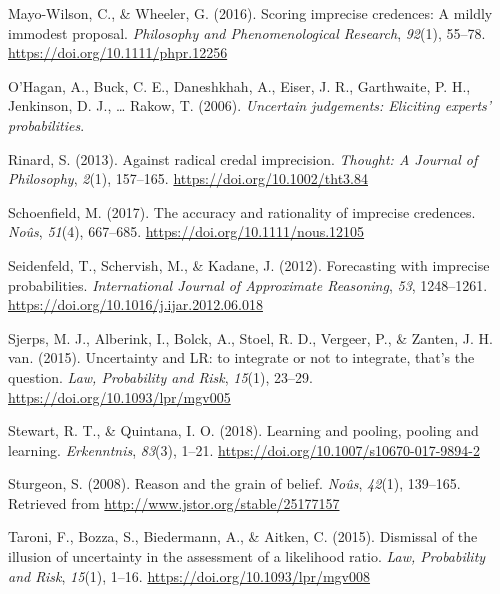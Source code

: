 \documentclass[
  10pt,
  dvipsnames,enabledeprecatedfontcommands]{scrartcl}
\newlength{\cslhangindent}
\newlength{\cslentryspacingunit} %
\newenvironment{CSLReferences}[2] %
 {%
  \setlength{\parindent}{0pt}
  \ifodd #1
  \let\oldpar\par
  \def\par{\hangindent=\cslhangindent\oldpar}
  \fi
  \setlength{\parskip}{#2\cslentryspacingunit}
 }%
 {}
\begin{document}
\begin{CSLReferences}{1}{0}
\leavevmode{}%
Mayo-Wilson, C., \& Wheeler, G. (2016). Scoring imprecise credences: A
mildly immodest proposal. \emph{Philosophy and Phenomenological
Research}, \emph{92}(1), 55--78.
\url{https://doi.org/10.1111/phpr.12256}

\leavevmode{}%
O'Hagan, A., Buck, C. E., Daneshkhah, A., Eiser, J. R., Garthwaite, P.
H., Jenkinson, D. J., \ldots{} Rakow, T. (2006). \emph{Uncertain
judgements: Eliciting experts' probabilities}.

\leavevmode{}%
Rinard, S. (2013). Against radical credal imprecision. \emph{Thought: A
Journal of Philosophy}, \emph{2}(1), 157--165.
\url{https://doi.org/10.1002/tht3.84}

\leavevmode{}%
Schoenfield, M. (2017). The accuracy and rationality of imprecise
credences. \emph{Noûs}, \emph{51}(4), 667--685.
\url{https://doi.org/10.1111/nous.12105}

\leavevmode{}%
Seidenfeld, T., Schervish, M., \& Kadane, J. (2012). Forecasting with
imprecise probabilities. \emph{International Journal of Approximate
Reasoning}, \emph{53}, 1248--1261.
\url{https://doi.org/10.1016/j.ijar.2012.06.018}

\leavevmode{}%
Sjerps, M. J., Alberink, I., Bolck, A., Stoel, R. D., Vergeer, P., \&
Zanten, J. H. van. (2015). {Uncertainty and LR: to integrate or not to
integrate, that's the question}. \emph{Law, Probability and Risk},
\emph{15}(1), 23--29. \url{https://doi.org/10.1093/lpr/mgv005}

\leavevmode{}%
Stewart, R. T., \& Quintana, I. O. (2018). Learning and pooling, pooling
and learning. \emph{Erkenntnis}, \emph{83}(3), 1--21.
\url{https://doi.org/10.1007/s10670-017-9894-2}

\leavevmode{}%
Sturgeon, S. (2008). Reason and the grain of belief. \emph{No{û}s},
\emph{42}(1), 139--165. Retrieved from
\url{http://www.jstor.org/stable/25177157}

\leavevmode{}%
Taroni, F., Bozza, S., Biedermann, A., \& Aitken, C. (2015). {Dismissal
of the illusion of uncertainty in the assessment of a likelihood ratio}.
\emph{Law, Probability and Risk}, \emph{15}(1), 1--16.
\url{https://doi.org/10.1093/lpr/mgv008}


\end{CSLReferences}
\end{document}
